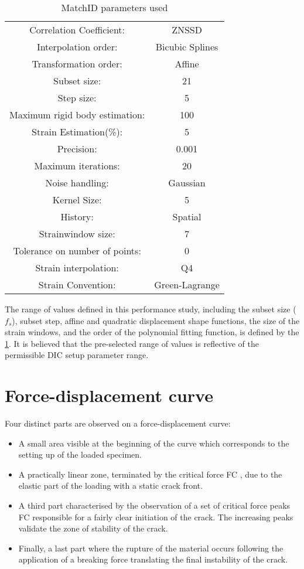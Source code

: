 \begin{table}[]
	\centering
	\begin{tabular}{c c}
		\hline
		Correlation   Coefficient: & ZNSSD \\ 
		Interpolation order: & Bicubic Splines \\ 
		Transformation order: & Affine \\
		Subset size: & 21 \\
		Step size: & 5 \\
		Maximum rigid body estimation: & 100 \\ 
		Strain Estimation(\%): & 5 \\ 
		Precision: & 0.001 \\ 
		Maximum iterations: & 20 \\ 
		Noise handling: & Gaussian \\ 
		Kernel Size: & 5 \\ 
		History: & Spatial \\ 
		Strainwindow size: & 7 \\ 
		Tolerance on number of points: & 0 \\ 
		Strain interpolation: & Q4 \\ 
		Strain Convention: & Green-Lagrange \\ \hline
	\end{tabular}
	\caption{MatchID parameters used}
	\label{tab:MatchID_param}
\end{table}

The range of values defined in this performance study, including the subset size ($f_s$), subset step, affine and quadratic displacement shape functions, the size of the strain windows, and the order of the polynomial fitting function, is defined by the \ref{tab:MatchID_param}. It is believed that the pre-selected range of values is reflective of the permissible DIC setup parameter range.

\section{Force-displacement curve}

Four distinct parts are observed on a force-displacement curve:

\begin{itemize}
	\item A small area visible at the beginning of the curve which corresponds to the setting up of the loaded specimen. 
	\item A practically linear zone, terminated by the critical force FC , due to the elastic part of the loading with a static crack front.
	\item A third part characterised by the observation of a set of critical force peaks FC responsible for a fairly clear initiation of the crack. The increasing peaks validate the zone of stability of the crack.
	\item Finally, a last part where the rupture of the material occurs following the application of a breaking force translating the final instability of the crack.
\end{itemize}


